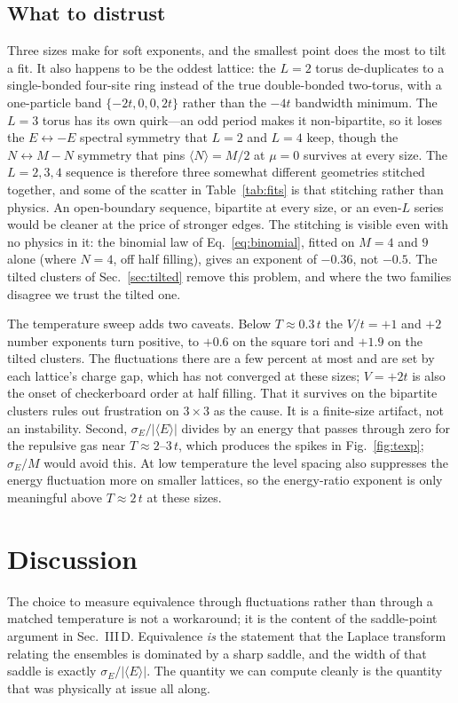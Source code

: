 \documentclass[twocolumn,10pt]{article}
\newcommand{\avg}[1]{\langle #1 \rangle}
\begin{document}
\subsection{What to distrust}
Three sizes make for soft exponents, and the smallest point does the most to tilt
a fit. It also happens to be the oddest lattice: the $L=2$ torus de-duplicates to
a single-bonded four-site ring instead of the true double-bonded two-torus, with
a one-particle band $\{-2t,0,0,2t\}$ rather than the $-4t$ bandwidth minimum. The
$L=3$ torus has its own quirk---an odd period makes it non-bipartite, so it loses
the $E\leftrightarrow-E$ spectral symmetry that $L=2$ and $L=4$ keep, though the
$N\leftrightarrow M-N$ symmetry that pins $\avg N=M/2$ at $\mu=0$ survives at
every size. The $L=2,3,4$ sequence is therefore three somewhat different
geometries stitched together, and some of the scatter in Table~\ref{tab:fits} is
that stitching rather than physics. An open-boundary sequence, bipartite at every
size, or an even-$L$ series would be cleaner at the price of stronger edges.
The stitching is visible even with no physics in it: the binomial law of
Eq.~\eqref{eq:binomial}, fitted on $M=4$ and $9$ alone (where $N=4$, off half
filling), gives an exponent of $-0.36$, not $-0.5$. The tilted clusters of
Sec.~\ref{sec:tilted} remove this problem, and where the two families disagree we trust the
tilted one.

The temperature sweep adds two caveats. Below $T\approx0.3\,t$ the $V/t=+1$ and
$+2$ number exponents turn positive, to $+0.6$ on the square tori and $+1.9$ on
the tilted clusters. The fluctuations there are a few percent at most and are
set by each lattice's charge gap, which has not converged at these sizes; $V=+2t$
is also the onset of checkerboard order at half filling. That it survives on the
bipartite clusters rules out frustration on $3\times3$ as the cause. It is a
finite-size artifact, not an instability. Second,
$\sigma_E/|\avg E|$ divides by an energy that passes through zero for the
repulsive gas near $T\approx2$--$3\,t$, which produces the spikes in
Fig.~\ref{fig:texp}; $\sigma_E/M$ would avoid this. At low temperature the
level spacing also suppresses the energy fluctuation more on smaller lattices,
so the energy-ratio exponent is only meaningful above $T\approx2\,t$ at these
sizes.

\section{Discussion}
The choice to measure equivalence through fluctuations rather than through a
matched temperature is not a workaround; it is the content of the saddle-point
argument in Sec.~III\,D. Equivalence \emph{is} the statement that the Laplace
transform relating the ensembles is dominated by a sharp saddle, and the width of
that saddle is exactly $\sigma_E/|\avg E|$. The quantity we can compute cleanly is
the quantity that was physically at issue all along.
\end{document}
